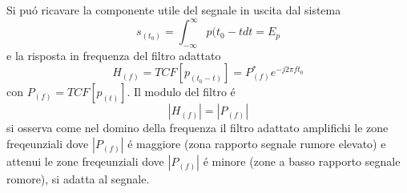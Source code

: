         \begin{figure}[H]
            \centering
            \hfill
        \end{figure}
        Si puó ricavare la componente utile del segnale in uscita dal sistema
        \[
            s_{(t_0)} = \int_{-\infty}^{\infty} p{(t_0-t}dt = E_p  
        \]
        e la risposta in frequenza del filtro adattato
        \[
            H_{(f)} = TCF[p_{(t_0-t)}] = P^*_{(f)}e^{-j2\pi ft_0}    
        \]
        con $P_(f) = TCF[p_{(t)}]$. Il modulo del filtro é 
        \[
            \left|H_{(f)}\right| = \left|P_{(f)}\right|   
        \] 
        si osserva come nel domino della frequenza il filtro adattato amplifichi le zone freqeunziali dove $ \left|P_{(f)}\right|$
        é maggiore (zona rapporto segnale rumore elevato) e attenui le zone freqeunziali dove $ \left|P_{(f)}\right|$ é minore 
        (zone a basso rapporto segnale romore), si adatta al segnale.

